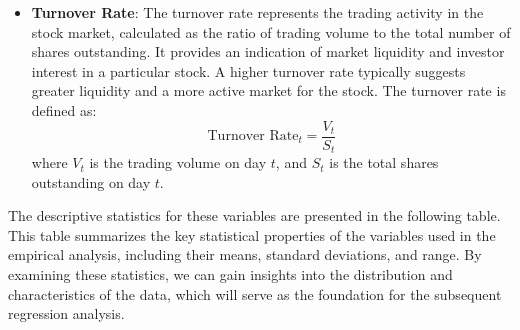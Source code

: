 \documentclass[preprint,12pt,authoryear]{elsarticle}
\begin{document}
\begin{itemize}
    \item \textbf{Turnover Rate}: The turnover rate represents the trading activity in the stock market, calculated as the ratio of trading volume to the total number of shares outstanding. It provides an indication of market liquidity and investor interest in a particular stock. A higher turnover rate typically suggests greater liquidity and a more active market for the stock. The turnover rate is defined as:
    \[
    \text{Turnover Rate}_t = \frac{V_t}{S_t}
    \]
    where $V_t$ is the trading volume on day $t$, and $S_t$ is the total shares outstanding on day $t$.
\end{itemize}

The descriptive statistics for these variables are presented in the following table. This table summarizes the key statistical properties of the variables used in the empirical analysis, including their means, standard deviations, and range. By examining these statistics, we can gain insights into the distribution and characteristics of the data, which will serve as the foundation for the subsequent regression analysis.

\begin{table}[h]
  \centering
  \caption{Descriptive Statistics}
  \label{tab:descriptive_stats_transposed}
\end{table}
\end{document}

